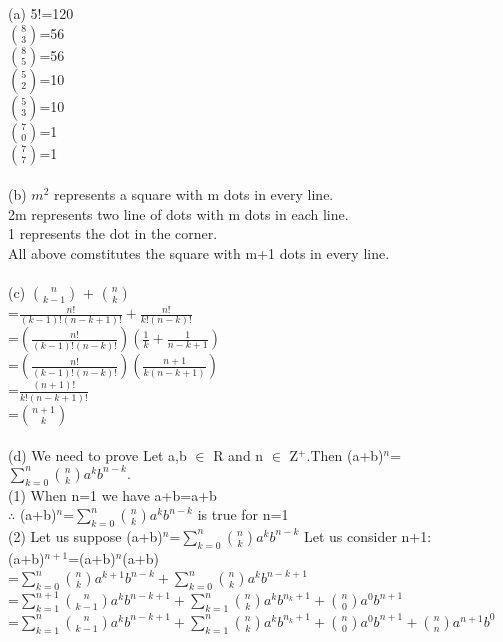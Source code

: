 \documentclass[11pt, a4paper, UTF8]{ctexart}
\begin{document}
\begin{solution}
(a) 5!=120\\
    $\binom{8}{3}$=56\\
    $\binom{8}{5}$=56\\
    $\binom{5}{2}$=10\\
    $\binom{5}{3}$=10\\
    $\binom{7}{0}$=1\\
    $\binom{7}{7}$=1\\
    \\
(b) $m^2$ represents a square with m dots in every line.\\
    2m represents two line of dots with m dots in each line.\\
    1 represents the dot in the corner.\\
    All above comstitutes the square with m+1 dots in every line.\\
    \\
(c) $\binom{n}{k-1}$ + $\binom{n}{k}$\\
=$\frac{n!}{(k-1)!(n-k+1)!}  +  \frac{n!}{k!(n-k)!}$\\
=$(\frac{n!}{(k-1)!(n-k)!})(\frac{1}{k}  +  \frac{1}{n-k+1})$\\
=$(\frac{n!}{(k-1)!(n-k)!})(\frac{n+1}{k(n-k+1)})$\\
=$\frac{(n+1)!}{k!(n-k+1)!}$\\
=$\binom{n+1}{k}$\\
\\
(d) We need to prove Let a,b $\in$ R and n $\in$ Z$^+$.Then (a+b)$^n$=$\sum\limits_{k=0}^{n}\binom{n}{k}  a^k b^{n-k}.$\\
    (1) When n=1 we have a+b=a+b\\
        $\therefore$  (a+b)$^n$=$\sum\limits_{k=0}^{n}\binom{n}{k}  a^k b^{n-k}$ is true for n=1\\
    (2) Let us suppose (a+b)$^n$=$\sum\limits_{k=0}^{n}\binom{n}{k}  a^k b^{n-k}$
    Let us consider n+1:\\
              (a+b)$^{n+1}$=(a+b)$^n$(a+b) \\
              =$\sum\limits_{k=0}^{n}\binom{n}{k}a^{k+1}b^{n-k}  +  \sum\limits_{k=0}^{n}\binom{n}{k}a^kb^{n-k+1}$\\
              =$\sum\limits_{k=1}^{n+1}\binom{n}{k-1}a^kb^{n-k+1}  +  \sum\limits_{k=1}^{n}\binom{n}{k}a^kb^{n_k+1}  +  \binom{n}{0}a^0b^{n+1}$\\
              =$\sum\limits_{k=1}^{n}\binom{n}{k-1}a^kb^{n-k+1}  +  \sum\limits_{k=1}^{n}\binom{n}{k}a^kb^{n_k+1}  +  \binom{n}{0}a^0b^{n+1}  +  \binom{n}{n}a^{n+1}b^0$\\

\end{solution}
\end{document}
